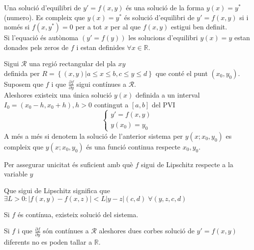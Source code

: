\documentclass[../main.tex]{subfiles}
\begin{document}
Una solució d'equilibri de $y' = f(x, y)$ és una solució de la forma $y(x) = y^*$ (numero). Es
compleix que $y(x) = y^*$ és solució d'equilibri de $y' = f(x, y)$ si i només si $f(x, y^*) = 0$ per
a tot $x$ per al que $f(x, y)$ estigui ben definit.\\
Si l'equació és autònoma $\left(y' = f(y)\right)$ les solucions d'equilibri $y(x) = y$ estan donades pels zeros
de $f$ i estan definides $\forall x \in \mathbb{R}$.
\begin{teorema}
    Sigui $\mathcal{R}$ una regió rectangular del pla $xy$\\definida per $R = \left\{(x, y) | a \leq x \leq b, c \leq y \leq d\right\}$
    que conté el punt $(x_0, y_0)$.\\
    Suposem que $f$ i que $\frac{\partial f}{\partial y}$ sigui contínues a $\mathcal{R}$.\\
    Aleshores existeix una única solució $y(x)$ definida a un interval $I_0 = (x_0-h, x_0+h), h > 0$
    contingut a $\left[a, b\right]$ del PVI
    \begin{displaymath}
        \begin{cases}
            y' = f(x,y)\\
            y(x_0) = y_0
        \end{cases}
    \end{displaymath}
    A més a més si denotem la solució de l'anterior sistema per $y(x; x_0, y_0)$ es compleix que $y(x; x_0, y_0)$
    és una funció continua respecte $x_0, y_0$.
    \begin{obs}
        Per assegurar unicitat és suficient amb què $f$ sigui de Lipschitz respecte a la variable $y$
        \begin{obs}
            Que sigui de Lipschitz significa que $\exists L > 0: \left\lvert f(x,y) - f(x,z)\right\rvert < L \left\lvert y-z\right\rvert(c, d)\;\forall(y, z, c, d)$
        \end{obs}
    \end{obs}
\end{teorema}
\begin{teorema}[de Peano]
    Si $f$ és contínua, existeix solució del sistema.
\end{teorema}
\begin{teorema}
    Si $f$ i que $\frac{\partial f}{\partial y}$ són contínues a $\mathcal{R}$ aleshores dues corbes
    solució de $y' = f(x,y)$ diferents no es poden tallar a $\mathbb{R}$.
\end{teorema}
\end{document}
